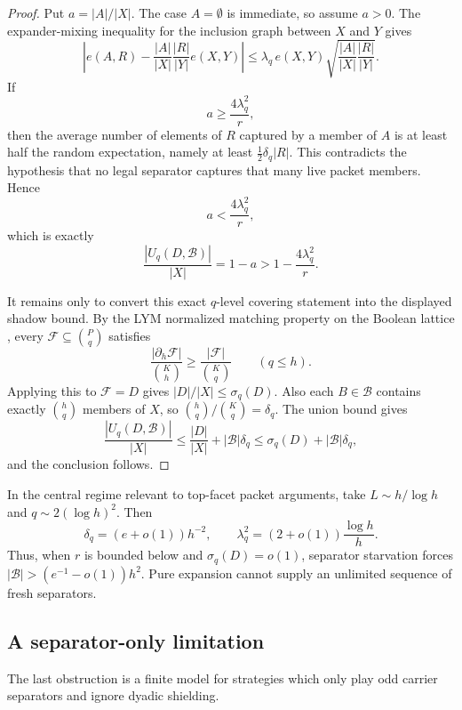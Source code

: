 \begin{proof}
Put $a=|A|/|X|$.  The case $A=\emptyset$ is immediate, so assume $a>0$.
The expander-mixing inequality for the inclusion graph between $X$ and $Y$
gives
\[
  \left|
  e(A,R)-\frac{|A|}{|X|}\frac{|R|}{|Y|}e(X,Y)
  \right|
  \le
  \lambda_q\,e(X,Y)\sqrt{\frac{|A|}{|X|}\frac{|R|}{|Y|}}.
\]
If
\[
  a\ge \frac{4\lambda_q^2}{r},
\]
then the average number of elements of $R$ captured by a member of $A$ is at
least half the random expectation, namely at least
$\frac12\delta_q |R|$.  This contradicts the hypothesis that no legal separator
captures that many live packet members.  Hence
\[
  a<\frac{4\lambda_q^2}{r},
\]
which is exactly
\[
  \frac{|U_q(D,\mathcal B)|}{|X|}
  =1-a
  >
  1-\frac{4\lambda_q^2}{r}.
\]

It remains only to convert this exact $q$-level covering statement into the
displayed shadow bound.  By the LYM normalized matching property on the Boolean
lattice \cite[Section~2.2]{Anderson87}, every
$\mathcal F\subseteq\binom Pq$ satisfies
\[
  \frac{|\partial_h\mathcal F|}{\binom Kh}
  \ge
  \frac{|\mathcal F|}{\binom Kq}
  \qquad(q\le h).
\]
Applying this to $\mathcal F=D$ gives $|D|/|X|\le\sigma_q(D)$.  Also each
$B\in\mathcal B$ contains exactly $\binom hq$ members of $X$, so
$\binom hq/\binom Kq=\delta_q$.  The union bound gives
\[
  \frac{|U_q(D,\mathcal B)|}{|X|}
  \le
  \frac{|D|}{|X|}+|\mathcal B|\delta_q
  \le
  \sigma_q(D)+|\mathcal B|\delta_q,
\]
and the conclusion follows.
\end{proof}

In the central regime relevant to top-facet packet arguments, take
$L\sim h/\log h$ and $q\sim 2(\log h)^2$.  Then
\[
  \delta_q=(e+o(1))h^{-2},
  \qquad
  \lambda_q^2=(2+o(1))\frac{\log h}{h}.
\]
Thus, when $r$ is bounded below and $\sigma_q(D)=o(1)$, separator starvation
forces $|\mathcal B|>(e^{-1}-o(1))h^2$.  Pure expansion cannot supply an
unlimited sequence of fresh separators.

\subsection{A separator-only limitation}

The last obstruction is a finite model for strategies which only play odd
carrier separators and ignore dyadic shielding.

